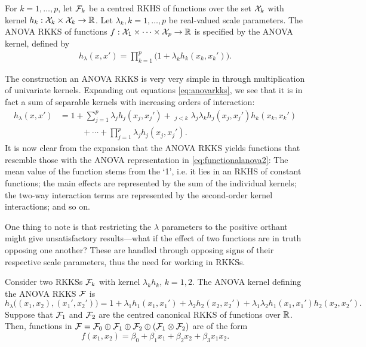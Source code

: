 \documentclass[a4paper,showframe,11pt,draft]{report}
\begin{document}
\begin{definition}
  For $k=1,\dots,p$, let ${\mathcal F}_k$ be a centred RKHS of functions over the set ${\mathcal X}_k$ with kernel $h_k:{\mathcal X}_k\times{\mathcal X}_k\to\mathbb{R}$. 
  Let $\lambda_k, k=1,\dots,p$ be real-valued scale parameters.
  The ANOVA RKKS of functions $f:{\mathcal X}_1\times\cdots\times{\mathcal X}_p\to\mathbb{R}$ is specified by the ANOVA kernel, defined by
  \begin{align}\label{eq:anovarkks}
    h_\lambda(x,x') = \prod_{k=1}^p \big( 1 + \lambda_k h_k(x_k,x_k') \big).
  \end{align}
\end{definition}

The construction an ANOVA RKKS is very very simple in through multiplication of univariate kernels.
Expanding out equations \eqref{eq:anovarkks}, we see that it is in fact a sum of separable kernels with increasing orders of interaction:
\begin{align*}
  h_\lambda(x,x') 
  &= 1 + \sum_{j=1}^p \lambda_j h_j(x_j,x_j') + \mathop{\sum_{j,k=1}^p}_{j<k} \lambda_j\lambda_k h_j(x_j,x_j')h_k(x_k,x_k') \\
  &\phantom{==} + \cdots + \prod_{j=1}^p \lambda_j h_j(x_j,x_j').
\end{align*}
It is now clear from the expansion that the ANOVA RKKS yields functions that resemble those with the ANOVA representation in \eqref{eq:functionalanova2}:
The mean value of the function stems from the `1', i.e. it lies in an RKHS of constant functions; the main effects are represented by the sum of the individual kernels; the two-way interaction terms are represented by the second-order kernel interactions; and so on.

One thing to note is that restricting the $\lambda$ parameters to the positive orthant might give unsatisfactory results---what if the effect of two functions are in truth opposing one another?
These are handled through opposing signs of their respective scale parameters, thus  the need for working in RKKSs.

\begin{example}
  Consider two RKKSs ${\mathcal F}_k$ with kernel $\lambda_k h_k$, $k=1,2$.
  The ANOVA kernel defining the ANOVA RKKS ${\mathcal F}$ is
  \[
    h_\lambda\big((x_1,x_2),(x_1',x_2') \big) = 1 + \lambda_1 h_1(x_1,x_1') + \lambda_2 h_2(x_2,x_2') + \lambda_1\lambda_2 h_1(x_1,x_1')h_2(x_2,x_2').
  \]  
  Suppose that ${\mathcal F}_1$ and ${\mathcal F}_2$ are the centred canonical RKKS of functions over $\mathbb{R}$.
  Then, functions in ${\mathcal F} = {\mathcal F}_0 \oplus {\mathcal F}_1 \oplus {\mathcal F}_2 \oplus ({\mathcal F}_1 \otimes {\mathcal F}_2)$ are of the form
  \[
    f(x_1,x_2) = \beta_0 + \beta_1x_1 + \beta_2x_2 + \beta_3x_1x_2.
  \]
\end{example}
\end{document}
